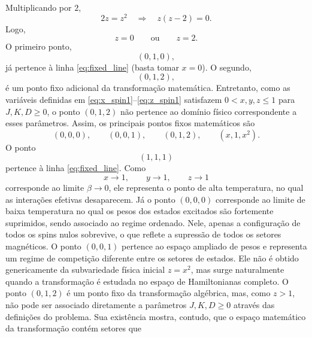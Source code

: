 \documentclass[12pt,a4paper]{article}
\begin{document}
%
Multiplicando por \(2\),
%
\begin{equation}
    2z=z^2
    \quad\Longrightarrow\quad
    z(z-2)=0.
\end{equation}
%
Logo,
%
\begin{equation}
    z=0
    \qquad\text{ou}\qquad
    z=2.
\end{equation}
%
O primeiro ponto,
%
\begin{equation}
    (0,1,0),
\end{equation}
%
já pertence à linha \eqref{eq:fixed_line} (basta tomar \(x=0\)).
O segundo,
%
\begin{equation}
    \boxed{
    (0,1,2),
    }
\end{equation}
%
é um ponto fixo adicional da transformação matemática. Entretanto, como as variáveis definidas em
\eqref{eq:x_spin1}--\eqref{eq:z_spin1} satisfazem \(0<x,y,z\le1\)
para \(J,K,D\ge0\), o ponto \((0,1,2)\) não pertence ao domínio físico
correspondente a esses parâmetros. Assim, os principais pontos fixos
matemáticos são
%
\begin{equation}
    \boxed{
    (0,0,0),\qquad
    (0,0,1),\qquad
    (0,1,2),
    \qquad
    (x,1,x^2).
    }
    \label{eq:all_fixed_p4}
\end{equation}
% 
O ponto
%
\begin{equation}
    \boxed{
    (1,1,1)
    }
\end{equation}
%
pertence à linha \eqref{eq:fixed_line}. Como
%
\begin{equation}
    x\to1,\qquad
    y\to1,\qquad
    z\to1
\end{equation}
%
corresponde ao limite \(\beta\to0\), ele representa o ponto de
alta temperatura, no qual as interações efetivas desaparecem. Já o ponto $(0,0,0)$ corresponde ao limite de baixa temperatura no qual os pesos dos
estados excitados são fortemente suprimidos, sendo associado ao regime
ordenado. Nele, apenas a configuração de todos os spins nulos
sobrevive, o que reflete a supressão de todos os setores magnéticos.
%
O ponto \((0,0,1)\) pertence ao espaço ampliado de pesos e representa
um regime de competição diferente entre os setores de estados. Ele não
é obtido genericamente da subvariedade física inicial \(z=x^2\), mas
surge naturalmente quando a transformação é estudada no espaço de
Hamiltonianas completo.
%
O ponto \((0,1,2)\) é um ponto fixo da transformação algébrica, mas,
como \(z>1\), não pode ser associado diretamente a parâmetros
\(J,K,D\ge0\) através das definições do problema. Sua existência mostra,
contudo, que o espaço matemático da transformação contém setores que
\end{document}
